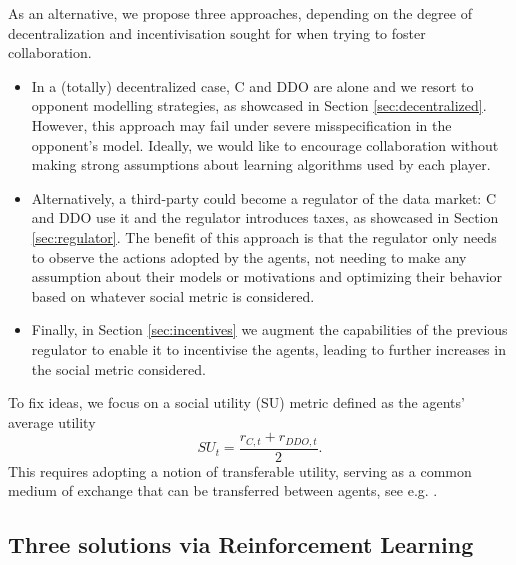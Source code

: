 As an alternative,  we propose three approaches, depending on the degree of decentralization and incentivisation sought for when trying 
to foster collaboration. 
\begin{itemize}
        \item In a (totally) decentralized case, C and DDO are alone and we resort to opponent modelling strategies,
        as showcased in Section \ref{sec:decentralized}. However, 
        this approach may fail under severe misspecification in the opponent's model. Ideally, we would
        like to encourage collaboration without making strong assumptions about learning algorithms used by each player. 
      
        \item Alternatively, a third-party could become a regulator of the data market: C and DDO use it and  
        the regulator introduces taxes, as showcased 
        in Section \ref{sec:regulator}. 
        The benefit of this approach is that the regulator only needs to observe the actions adopted by the agents, not needing to make any assumption about their models or motivations and optimizing their behavior based on whatever social metric is considered.
        
        \item Finally, in Section \ref{sec:incentives} we augment the capabilities of the previous regulator to enable it to  incentivise the agents, leading to further increases in the social metric considered.
    \end{itemize}

\noindent To fix ideas, we focus on a social utility (SU) metric
defined as the agents' average utility  
\begin{equation}\label{eq:su}
SU_t = \frac{r_{C,t} + r_{DDO,t}}{2}.
\end{equation}
This requires adopting a notion of transferable utility,
serving as a common medium of exchange that can be transferred between agents, see e.g. \parencite{aumann1960}.



\subsection{Three solutions via Reinforcement Learning}\label{sec:sols}


